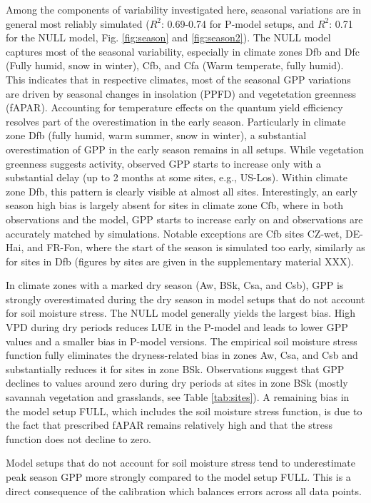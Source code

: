 \documentclass{myreport}
\newcommand{\rsq}{$R^2$}
\begin{document}
Among the components of variability investigated here, seasonal variations are in general most reliably simulated (\rsq : 0.69-0.74 for P-model setups, and \rsq : 0.71 for the NULL model, Fig. \ref{fig:season} and \ref{fig:season2}). The NULL model captures most of the seasonal variability, especially in climate zones Dfb and Dfc (Fully humid, snow in winter), Cfb, and Cfa (Warm temperate, fully humid). This indicates that in respective climates, most of the  seasonal GPP variations are driven by seasonal changes in insolation (PPFD) and vegetetation greenness (fAPAR). Accounting for temperature effects on the quantum yield efficiency resolves part of the overestimation in the early season. Particularly in climate zone Dfb (fully humid, warm summer, snow in winter), a substantial overestimation of GPP in the early season remains in all setups. While vegetation greenness suggests activity, observed GPP starts to increase only with a substantial delay (up to 2 months at some sites, e.g., US-Los). Within climate zone Dfb, this pattern is clearly visible at almost all sites. Interestingly, an early season high bias is largely absent for sites in climate zone Cfb, where in both observations and the model, GPP starts to increase early on and observations are accurately matched by simulations. Notable exceptions are Cfb sites CZ-wet, DE-Hai, and FR-Fon, where the start of the season is simulated too early, similarly as for sites in Dfb (figures by sites are given in the supplementary material XXX).

In climate zones with a marked dry season (Aw, BSk, Csa, and Csb), GPP is strongly overestimated during the dry season in model setups that do not account for soil moisture stress. The NULL model generally yields the largest bias. High VPD during dry periods reduces LUE in the P-model and leads to lower GPP values and a smaller bias in P-model versions. The empirical soil moisture stress function fully eliminates the dryness-related bias in zones Aw, Csa, and Csb and substantially reduces it for sites in zone BSk. Observations suggest that GPP declines to values around zero during dry periods at sites in zone BSk (mostly savannah vegetation and grasslands, see Table \ref{tab:sites}). A remaining bias in the model setup FULL, which includes the soil moisture stress function, is due to the fact that prescribed fAPAR remains relatively high and that the stress function does not decline to zero.

Model setups that do not account for soil moisture stress tend to underestimate peak season GPP more strongly compared to the model setup FULL. This is a direct consequence of the calibration which balances errors across all data points.
\end{document}
